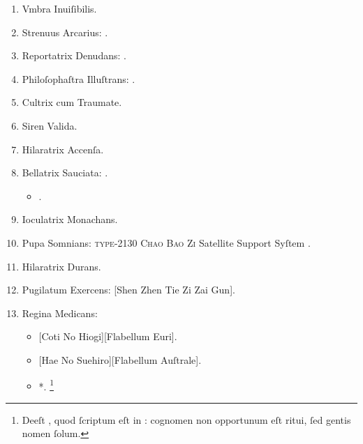 \documentclass[12pt]{book}
\newcommand{\reconst}{*}
\begin{document}
\begin{enumerate}
  \renewcommand\labelenumi{\Roman{enumi}.}

  \item Vmbra Inuiſibilis.
  \item Strenuus Arcarius: .
  \item Reportatrix Denudans: .
  \item Philoſophaſtra Illuſtrans: .
  \item Cultrix cum Traumate.
  \item Siren Valida.
  \item Hilaratrix Accenſa.
  \item Bellatrix Sauciata: .

        \begin{itemize}
          \item {}.
        \end{itemize}

  \item Ioculatrix Monachans.
  \item Pupa Somnians: \textsc{type-2130 Chao Bao Zi} Satellite Support Syſtem .
  \item Hilaratrix Durans.
  \item Pugilatum Exercens: [Shen Zhen Tie Zi Zai Gun].
  \item Regina Medicans:

        \begin{itemize}
          \item {}[Coti No Hiogi][Flabellum Euri].
          \item {}[Hae No Suehiro][Flabellum Auſtrale].
          \item \reconst{}.%
                \footnote{%
                  Deeſt , quod ſcriptum eſt in :
                  cognomen non opportunum eſt ritui, ſed gentis nomen ſolum.
                }
        \end{itemize}


\end{enumerate}
\end{document}
